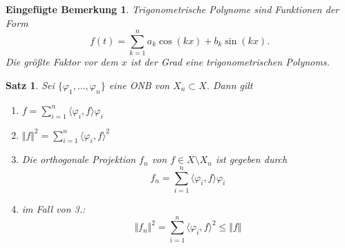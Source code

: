 \documentclass{book}
\newtheorem{theorem}[algorithm]{Satz}
\newtheorem*{mremark}{Eingefügte Bemerkung}
\begin{document}
            \begin{mremark}
                Trigonometrische Polynome sind Funktionen der Form
                \begin{equation*}
                    f(t)=\sum_{k=1}^n a_k \cos(kx)+ b_k \sin(kx).
                \end{equation*}
                Die größte Faktor vor dem $x$ ist der Grad eine trigonometrischen Polynoms.
            \end{mremark}

            \begin{theorem}\label{s1.16}
                Sei $\{\varphi_1,\dots,\varphi_n\}$ eine ONB von $X_n\subset X$. Dann gilt
                \begin{enumerate}
                    \item $f=\sum_{i=1}^n \langle \varphi_i,f \rangle\varphi_i$
                    \item $\Vert f \Vert^2=\sum_{i=1}^n \langle \varphi_i,f \rangle^2$
                    \item Die orthogonale Projektion $f_n$ von $f\in X\setminus X_n$ ist gegeben durch 
                        \begin{equation*}
                            f_n=\sum_{i=1}^n \langle \varphi_i,f \rangle\varphi_i
                        \end{equation*}
                    \item im Fall von 3.:
                        \begin{equation*}
                            \Vert f_n \Vert^2 = \sum_{i=1}^n \langle \varphi_i,f \rangle^2 \leq \Vert f \Vert
                        \end{equation*}
                \end{enumerate}
            \end{theorem}
            
\end{document}
